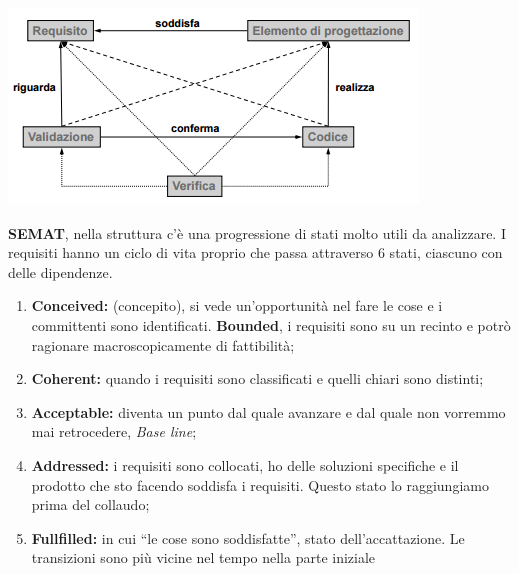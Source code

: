 \includegraphics[width=0.5\columnwidth]{img3}

\textbf{SEMAT}, nella struttura c'è una progressione di stati molto utili da analizzare. I requisiti hanno un ciclo di vita proprio che passa attraverso 6 stati, ciascuno con delle dipendenze.
\begin{enumerate}
	\item \textbf{Conceived:} (concepito), si vede un'opportunità nel fare le cose e i committenti sono identificati. \textbf{Bounded}, i requisiti sono su un recinto e potrò ragionare macroscopicamente di fattibilità;
	\item \textbf{Coherent:} quando i requisiti sono classificati e quelli chiari sono distinti;
	\item \textbf{Acceptable:} diventa un punto dal quale avanzare e dal quale non vorremmo mai retrocedere, \textit{Base line};
	\item \textbf{Addressed:} i requisiti sono collocati, ho delle soluzioni specifiche e il prodotto che sto facendo soddisfa i requisiti. Questo stato lo raggiungiamo prima del collaudo;
	\item \textbf{Fullfilled:} in cui ``le cose sono soddisfatte'', stato dell'accattazione. Le transizioni sono più vicine nel tempo nella parte iniziale
\end{enumerate} 

